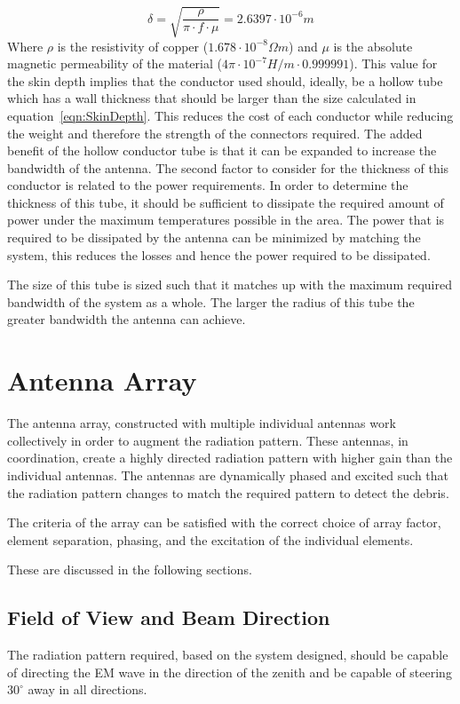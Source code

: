 \documentclass[11pt]{witseiepaper}
\begin{document}
\begin{equation} \label{eqn:SkinDepth}
\delta = \sqrt{\frac{\rho}{\pi \cdot f \cdot \mu}} = 2.6397 \cdot 10^{-6} m
\end{equation}
Where $\rho$ is the resistivity of copper ($1.678 \cdot 10^{-8} \Omega m$) and $\mu$ is the absolute magnetic permeability of the material ($4 \pi \cdot 10^{-7} H/m \cdot 0.999991$).
This value for the skin depth implies that the conductor used should, ideally, be a hollow tube which has a wall thickness that should be larger than the size calculated in equation~\ref{eqn:SkinDepth}. This reduces the cost of each conductor while reducing the weight and therefore the strength of the connectors required.
The added benefit of the hollow conductor tube is that it can be expanded to increase the bandwidth of the antenna. 
The second factor to consider for the thickness of this conductor is related to the power requirements. In order to determine the thickness of this tube, it should be sufficient to dissipate the required amount of power under the maximum temperatures possible in the area. The power that is required to be dissipated by the antenna can be minimized by matching the system, this reduces the losses and hence the power required to be dissipated.


The size of this tube is sized such that it matches up with the maximum required bandwidth of the system as a whole. The larger the radius of this tube the greater bandwidth the antenna can achieve.



\section{Antenna Array} \label{sec:AntennaArray}
The antenna array, constructed with multiple individual antennas work collectively in order to augment the radiation pattern. These antennas, in coordination, create a highly directed radiation pattern with higher gain than the individual antennas. The antennas are dynamically phased and excited such that the radiation pattern changes to match the required pattern to detect the debris.

The criteria of the array can be satisfied with the correct choice of array factor, element separation, phasing, and the excitation of the individual elements.

These are discussed in the following sections.

\subsection{Field of View and Beam Direction} \label{sec:FieldofViewandBeamDirection}
The radiation pattern required, based on the system designed, should be capable of directing the EM wave in the direction of the zenith and be capable of steering $30^{\circ}$ away in all directions.
\end{document}
